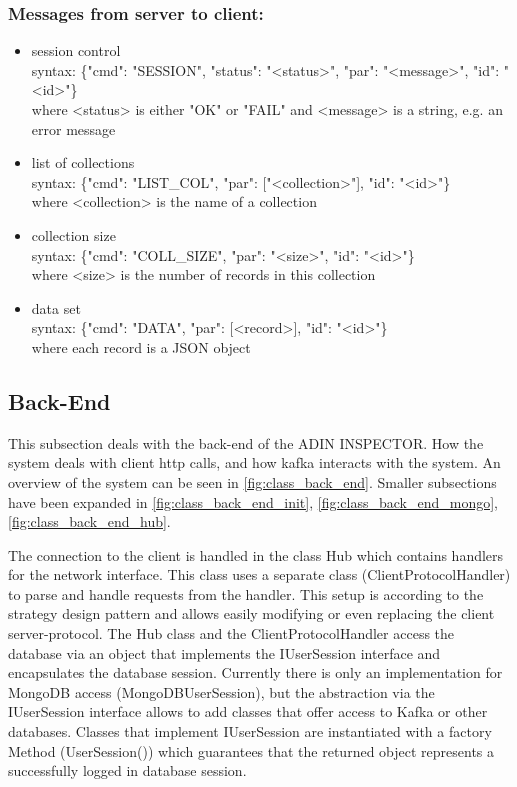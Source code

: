 \documentclass[oneside, english, final]{design}
\begin{document}
\subsubsection{Messages from server to client:}
\begin{itemize}
	\item{session control}
	      \\
	      syntax: \{"cmd": "SESSION", "status": "<status>", "par": "<message>", "id": "<id>"\} \\
	      where <status> is either "OK" or "FAIL" and <message> is a string, e.g. an error message\\

	\item{list of collections}
	      \\
	      syntax: \{"cmd": "LIST\_COL", "par": ["<collection>"], "id": "<id>"\} \\
	      where <collection> is the name of a collection\\

	\item{collection size}
	      \\
	      syntax: \{"cmd": "COLL\_SIZE", "par": "<size>", "id": "<id>"\} \\
	      where <size> is the number of records in this collection\\
	\item{data set}
	      \\
	      syntax: \{"cmd": "DATA", "par": [<record>], "id": "<id>"\} \\
	      where each record is a JSON object
\end{itemize}

\subsection{Back-End}
This subsection deals with the back-end of the ADIN INSPECTOR. How the system deals with client http calls, and how kafka interacts with the system.
An overview of the system can be seen in \autoref{fig:class_back_end}. Smaller subsections have been expanded in \autoref{fig:class_back_end_init}, \autoref{fig:class_back_end_mongo}, \autoref{fig:class_back_end_hub}.

The connection to the client is handled in the class Hub which contains handlers for the network interface. This class uses a separate class (ClientProtocolHandler) to parse and handle requests from the handler. This setup is according to the strategy design pattern and allows easily modifying or even replacing the client server-protocol.
The Hub class and the ClientProtocolHandler access the database via an object that implements the IUserSession interface and encapsulates the database session. Currently there is only an implementation for MongoDB access (MongoDBUserSession), but the abstraction via the IUserSession interface allows to add classes that offer access to Kafka or other databases.
Classes that implement IUserSession are instantiated with a factory Method (UserSession()) which guarantees that the returned object represents a successfully logged in database session.
\end{document}
